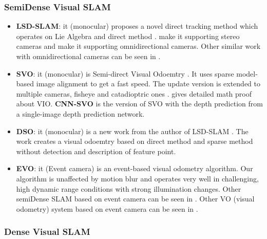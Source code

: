 \documentclass[journal,transmag]{IEEEtran}
\begin{document}
\subsubsection{SemiDense Visual SLAM}

\begin{itemize}
    \item \textbf{LSD-SLAM}:  it (monocular) proposes a novel direct tracking method which operates on Lie Algebra and direct method \cite{engel2014lsd}. \cite{engel2015large} make it supporting stereo cameras and \cite{caruso2015large} make it supporting omnidirectional cameras. Other similar work with omnidirectional cameras can be seen in \cite{li2018spherical}.
    \item \textbf{SVO}: it (monocular) is Semi-direct Visual Odoemtry \cite{forster2016svo}. It uses sparse model-based image alignment to get a fast speed. The update version is extended to multiple cameras, fisheye and catadioptric ones \cite{forster2016manifold}. \cite{forster2016manifold} gives detailed math proof about VIO. \textbf{CNN-SVO} \cite{loo2018cnn} is the version of  SVO with the depth prediction from a single-image depth prediction network.
    \item \textbf{DSO}:  it (monocular) \cite{DBLP:journals/corr/EngelKC16}\cite{engel2017direct} is a new work from the author of LSD-SLAM \cite{engel2014lsd}. The work creates a visual odoemtry based on direct method and sparse method without detection and description of feature point.
    \item \textbf{EVO}: it (Event camera) \cite{rebecq2016evo} is an event-based visual odometry algorithm. Our algorithm is unaffected by motion blur and operates very well in challenging, high dynamic range conditions with strong illumination changes. Other semiDense SLAM based on event camera can be seen in \cite{zhou2018semi}. Other VO (visual odometry) system based on event camera can be seen in \cite{weikersdorfer2013simultaneous}\cite{weikersdorfer2014event}.

\end{itemize}

\subsubsection{Dense Visual SLAM}
\end{document}
